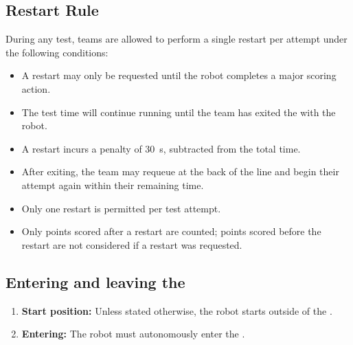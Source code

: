 \subsection{Restart Rule}
\label{rule:restart}

During any test, teams are allowed to perform a single restart per attempt under the following conditions:
\begin{itemize}
    \item A restart may only be requested until the robot completes a major scoring action.
    \item The test time will continue running until the team has exited the \Arena{} with the robot.
    \item A restart incurs a penalty of \SI{30}{\second}, subtracted from the total time.
    \item After exiting, the team may requeue at the back of the line and begin their attempt again within their remaining time.
    \item Only one restart is permitted per test attempt.
    \item Only points scored after a restart are counted; points scored before the restart are not considered if a restart was requested.
\end{itemize}


\subsection{Entering and leaving the \Arena{}}
\label{rule:start_position}
\begin{enumerate}

	\item \textbf{Start position:} Unless stated otherwise, the robot starts outside of the \Arena{}.
	\item \textbf{Entering:} The robot must autonomously enter the \Arena{}.
\end{enumerate}



